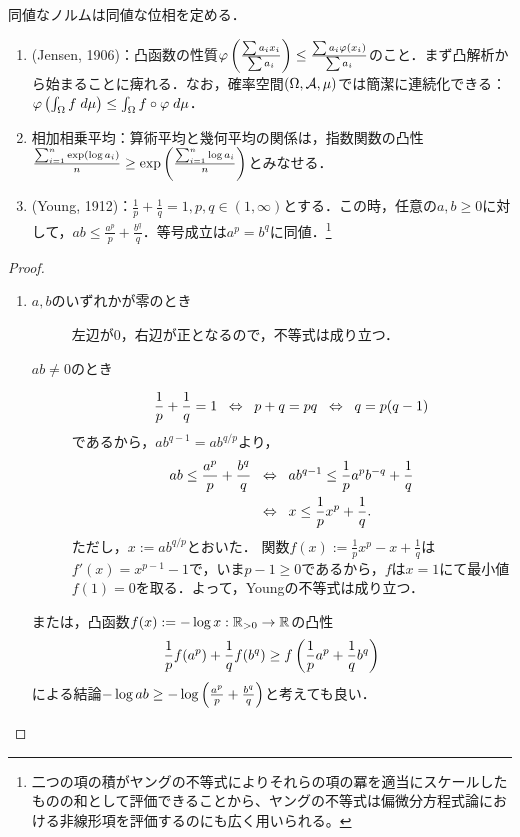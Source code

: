 \documentclass[uplatex, dvipdfmx]{jsreport}
\begin{document}
\begin{proposition}
    同値なノルムは同値な位相を定める．
\end{proposition}

\begin{proposition}[凸関数論]\mbox{}
    \begin{enumerate}
        \item (Jensen, 1906)：凸函数の性質$\varphi\left(\frac{\sum a_ix_i}{\sum a_i}\right)\le\frac{\sum a_i\varphi(x_i)}{\sum a_i}$のこと．まず凸解析から始まることに痺れる．なお，確率空間$(\Omega,\mathcal{A},\mu)$では簡潔に連続化できる：$\varphi\left(\int_\Omega f\;d\mu\right)\le\int_\Omega f\circ\varphi\;d\mu$．
        \item 相加相乗平均：算術平均と幾何平均の関係は，指数関数の凸性$\frac{\sum^n_{i=1}\exp(\log a_i)}{n}\ge\exp\left(\frac{\sum^n_{i=1}\log a_i}{n}\right)$とみなせる．
        \item (Young, 1912)：$\frac{1}{p}+\frac{1}{q}=1,p,q\in(1,\infty)$とする．この時，任意の$a,b\ge 0$に対して，$ab\le\frac{a^p}{p}+\frac{b^q}{q}$．等号成立は$a^p=b^q$に同値．\footnote{二つの項の積がヤングの不等式によりそれらの項の冪を適当にスケールしたものの和として評価できることから、ヤングの不等式は偏微分方程式論における非線形項を評価するのにも広く用いられる。}
    \end{enumerate}
\end{proposition}
\begin{proof}\mbox{}
    \begin{enumerate}
        \item 
        \begin{description}
            \item[$a,b$のいずれかが零のとき] 左辺が$0$，右辺が正となるので，不等式は成り立つ．
            \item[$ab\ne 0$のとき] 
            \[\frac{1}{p}+\frac{1}{q}=1\;\;\Leftrightarrow\;\; p+q=pq\;\;\Leftrightarrow\;\; q=p(q-1)\]であるから，$ab^{q-1}=ab^{q/p}$より，
            \begin{align*}
                ab\le\frac{a^p}{p}+\frac{b^q}{q}&\;\;\Leftrightarrow\;\; ab^{q-1}\le\frac{1}{p}a^pb^{-q}+\frac{1}{q}\\
                &\;\;\Leftrightarrow\;\; x\le\frac{1}{p}x^p+\frac{1}{q}.
            \end{align*}
            ただし，$x:=ab^{q/p}$とおいた．
            関数$f(x):=\frac{1}{p}x^p-x+\frac{1}{q}$は$f'(x)=x^{p-1}-1$で，いま$p-1\ge 0$であるから，$f$は$x=1$にて最小値$f(1)=0$を取る．よって，Youngの不等式は成り立つ．
        \end{description}
        または，凸函数$f(x):=-\log x:\mathbb{R}_{>0}\to\mathbb{R}$の凸性
        \[\frac{1}{p}f(a^p)+\frac{1}{q}f(b^q)\ge f\left(\frac{1}{p}a^p+\frac{1}{q}b^q\right)\]
        による結論$-\log ab\ge -\log\left(\frac{a^p}{p}+\frac{b^q}{q}\right)$と考えても良い．
    \end{enumerate}
\end{proof}
\end{document}
